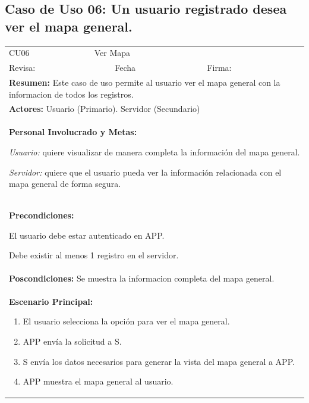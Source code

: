 		\subsection{Caso de Uso 06: Un usuario registrado desea ver el mapa general.}
			\begin{longtable}{|l|p{5.5cm}|l|p{2cm}|l|p{1.9cm}|} \hline
				\cellcolor{grisOscuro} CU06 & \multicolumn{4}{|l|}{  \cellcolor{grisOscuro} Ver Mapa} &  \cellcolor{grisClaro}\multirow{2}{1cm}{} \\ \cline{1-5}
				\cellcolor{grisOscuro} Revisa: &  \cellcolor{grisClaro} &  \cellcolor{grisOscuro} Fecha &  \cellcolor{grisClaro} &  \cellcolor{grisOscuro} Firma: & \cellcolor{grisClaro} \\ \hline
				\multicolumn{6}{|p{15cm}|}{ \textbf{Resumen: } Este caso de uso permite al usuario ver el mapa general con la informacion de todos los registros.

				} \\ \hline

				\multicolumn{6}{|p{15cm}|}{ \textbf{Actores: } Usuario (Primario). Servidor (Secundario)

				} \\ \hline

				\multicolumn{6}{|p{15cm}|}{ \textbf{Personal Involucrado y Metas: }
				
				\emph{Usuario:} quiere visualizar de manera completa la información del mapa general.

				\emph{Servidor:} quiere que el usuario pueda ver la información relacionada con el mapa general de forma segura.

				} \\ \hline

				\multicolumn{6}{|p{15cm}|}{ \textbf{Precondiciones: } 
				
				El usuario debe estar autenticado en APP.
				
				Debe existir al menos 1 registro en el servidor.

				} \\ \hline

				\multicolumn{6}{|p{15cm}|}{ \textbf{Poscondiciones: } Se muestra la informacion completa del mapa general.

				} \\ \hline

				\multicolumn{6}{|p{15cm}|}{ \textbf{Escenario Principal: }

				\begin{enumerate}
					\item El usuario selecciona la opción para ver el mapa general.
					\item APP envía la solicitud a S.
					\item S envía los datos necesarios para generar la vista del mapa general a APP.
					\item APP muestra el mapa general al usuario.
				\end{enumerate}

}
\end{longtable}
